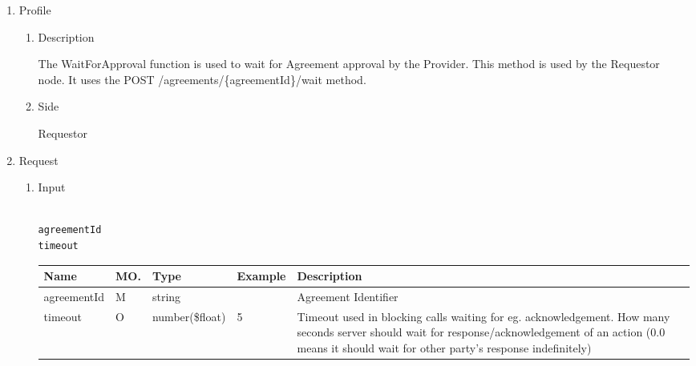\begin{enumerate}

\item Profile

\begin{enumerate}

\item Description

The WaitForApproval function is used to wait for Agreement approval by the Provider. This method is used by the Requestor node. 
It uses the POST /agreements/\{agreementId\}/wait method.

\item Side

Requestor

\end{enumerate}

\item Request

\begin{enumerate}

\item Input

\begin{tcolorbox}[boxrule=0pt, frame empty]
\begin{verbatim}

agreementId
timeout

\end{verbatim}
\end{tcolorbox}


\begin{center}
\begin{tabular}{|p{3cm}|l|p{3cm}|p{3cm}|p{4cm}|} 
\hline
\rowcolor{lightgray}	Name	& MO.	& Type	& Example & 	Description \\
\hline

agreementId		& M & 	string				&		& 	Agreement Identifier \\
\hline

timeout 		& O	& 	number(\$float)				&	5	&	Timeout used in blocking calls waiting for eg. acknowledgement. 
																How many seconds server should wait for response/acknowledgement of an action 
																(0.0 means it should wait for other party's response indefinitely)	\\ 
\hline


\end{tabular}
\end{center}
\end{enumerate}
\end{enumerate}
